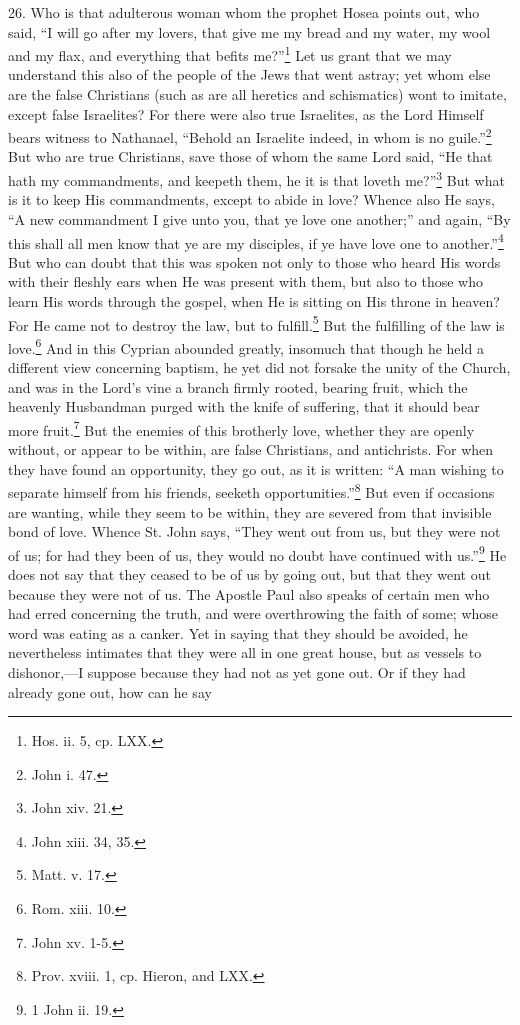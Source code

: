 26. Who is that adulterous woman whom the prophet Hosea points out, who said, ``I will go after my lovers, that give me my bread and my water, my wool and my flax, and everything that befits me?''\footnote{\par  Hos. ii. 5, cp. LXX.} Let us grant that we may understand this also of the people of the Jews that went astray; yet whom else are the false Christians (such as are all heretics and schismatics) wont to imitate, except false Israelites? For there were also true Israelites, as the Lord Himself bears witness to Nathanael, ``Behold an Israelite indeed, in whom is no guile.''\footnote{\par  John i. 47.} But who are true Christians, save those of whom the same Lord said, ``He that hath my commandments, and keepeth them, he it is that loveth me?''\footnote{\par  John xiv. 21.} But what is it to keep His commandments, except to abide in love? Whence also He says, ``A new commandment I give unto you, that ye love one another;'' and again, ``By this shall all men know that ye are my disciples, if ye have love one to another.''\footnote{\par  John xiii. 34, 35.} But who can doubt that this was spoken not only to those who heard His words with their fleshly ears when He was present with them, but also to those who learn His words through the gospel, when He is sitting on His throne in heaven? For He came not to destroy the law, but to fulfill.\footnote{\par  Matt. v. 17.} But the fulfilling of the law is love.\footnote{\par  Rom. xiii. 10.} And in this Cyprian abounded greatly, insomuch that though he held a different view concerning baptism, he yet did not forsake the unity of the Church, and was in the Lord’s vine a branch firmly rooted, bearing fruit, which the heavenly Husbandman purged with the knife of suffering, that it should bear more fruit.\footnote{\par  John xv. 1-5.} But the enemies of this brotherly love, whether they are openly without, or appear to be within, are false Christians, and antichrists. For when they have found an opportunity, they go out, as it is written: ``A man wishing to separate himself from his friends, seeketh opportunities.''\footnote{\par  Prov. xviii. 1, cp. Hieron, and LXX.} But even if occasions are wanting, while they seem to be within, they are severed from that invisible bond of love. Whence St. John says, ``They went out from us, but they were not of us; for had they been of us, they would no doubt have continued with us.''\footnote{\par  1 John ii. 19.} He does not say that they ceased to be of us by going out, but that they went out because they were not of us. The Apostle Paul also speaks of certain men who had erred concerning the truth, and were overthrowing the faith of some; whose word was eating as a canker. Yet in saying that they should be avoided, he nevertheless intimates that they were all in one great house, but as vessels to dishonor,—I suppose because they had not as yet gone out. Or if they had already gone out, how can he say 
